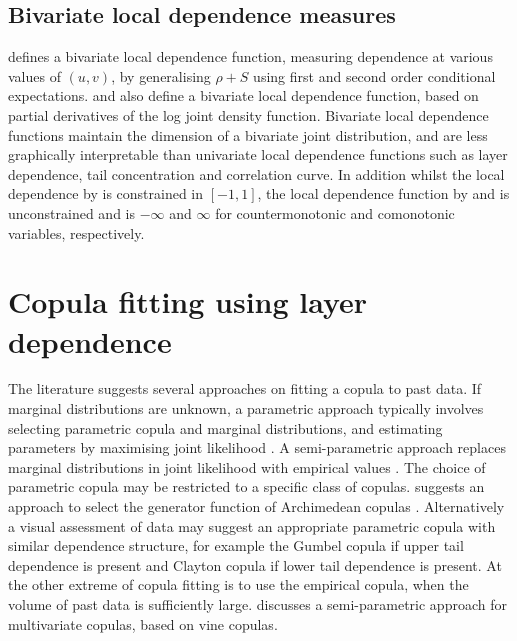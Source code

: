 \documentclass[authoryear]{elsarticle}
\begin{document}
\subsection{Bivariate local dependence measures}

\cite{bairamov2003new} defines a bivariate local dependence function, measuring dependence at various values of $(u,v)$, by generalising  $\rho+S$ using first and second order conditional expectations. \cite{jones1996local} and \cite{holland1987dependence} also define a bivariate local dependence function, based on partial derivatives of the log joint density function. Bivariate local dependence functions maintain the dimension of a bivariate joint distribution, and are less graphically interpretable than univariate local dependence functions such as layer dependence, tail concentration and correlation curve. In addition whilst the local dependence by \cite{bairamov2003new} is constrained in $[-1,1]$, the local dependence function by \cite{jones1996local} and \cite{holland1987dependence} is unconstrained and is $-\infty$ and $\infty$ for countermonotonic and comonotonic variables, respectively.




\section{Copula fitting using layer dependence}\label{sfitting}

The literature suggests several approaches on fitting a copula to past data. If marginal distributions are unknown, a parametric approach typically involves selecting parametric copula and marginal distributions, and estimating parameters by maximising joint likelihood \citep{denuitactuarial}. A semi-parametric approach replaces marginal distributions in joint likelihood with empirical values \citep{oakes1989bivariate}. The choice of parametric copula may be restricted to a specific class of copulas. \cite{genest1993statistical} suggests an approach to select the generator function of Archimedean copulas \citep{mcneil2005qrm}. Alternatively a visual assessment of data may suggest an appropriate parametric copula with similar dependence structure, for example the Gumbel copula if upper tail dependence is present and Clayton copula if lower tail dependence is present. At the other extreme of copula fitting is to use the empirical copula, when the volume of past data is sufficiently large. \citep{czado2010pair} discusses a semi-parametric approach for multivariate copulas, based on vine copulas.
\end{document}
